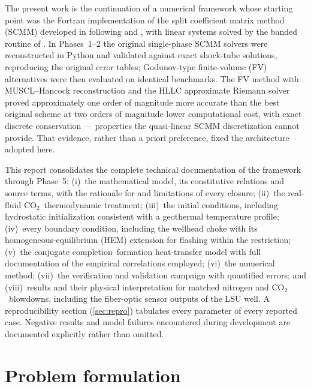 \documentclass[11pt]{article}
\newcommand{\co}{CO$_2$}
\begin{document}
The present work is the continuation of a numerical framework whose
starting point was the Fortran implementation of the split coefficient
matrix method (SCMM) developed in \citet{gessner2010} following
\citet{chakravarthy1980} and \citet{stadtke2006}, with linear systems
solved by the banded routine of \citet{aziz1979}. In Phases~1--2 the
original single-phase SCMM solvers were reconstructed in Python and
validated against exact shock-tube solutions, reproducing the original
error tables; Godunov-type finite-volume (FV) alternatives were then
evaluated on identical benchmarks. The FV method with MUSCL--Hancock
reconstruction \citep{vanleer1984,toro2009} and the HLLC approximate
Riemann solver \citep{toro1994} proved approximately one order of
magnitude more accurate than the best original scheme at two orders of
magnitude lower computational cost, with exact discrete conservation ---
properties the quasi-linear SCMM discretization cannot provide. That
evidence, rather than a priori preference, fixed the architecture
adopted here.

This report consolidates the complete technical documentation of the
framework through Phase~5: (i)~the mathematical model, its constitutive
relations and source terms, with the rationale for and limitations of
every closure; (ii)~the real-fluid \co\ thermodynamic treatment;
(iii)~the initial conditions, including hydrostatic initialization
consistent with a geothermal temperature profile; (iv)~every boundary
condition, including the wellhead choke with its homogeneous-equilibrium
(HEM) extension for flashing within the restriction; (v)~the conjugate
completion--formation heat-transfer model with full documentation of the
empirical correlations employed; (vi)~the numerical method; (vii)~the
verification and validation campaign with quantified errors; and
(viii)~results and their physical interpretation for matched nitrogen
and \co\ blowdowns, including the fiber-optic sensor outputs of the LSU
well. A reproducibility section (\cref{sec:repro}) tabulates every
parameter of every reported case. Negative results and model failures
encountered during development are documented explicitly rather than
omitted.

\section{Problem formulation}
\label{sec:problem}
\end{document}
